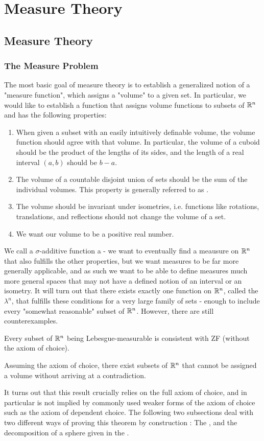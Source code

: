 \part{Measure Theory}
\parttoc
\chapter{Measure Theory}
\section{The Measure Problem}
The most basic goal of measure theory is to establish a generalized notion of a "measure function", which assigns a "volume" to a given set. In particular, we would like to establish a function that assigns volume functions to subsets of $\mathbb{R}^n$ and has the following properties:
\begin{enumerate}
	\item When given a subset with an easily intuitively definable volume, the volume function should agree with that volume. In particular, the volume of a cuboid should be the product of the lengths of its sides, and the length of a real interval $(a,b)$ should be $b-a$.
	\item The volume of a countable disjoint union of sets should be the sum of the individual volumes. This property is generally referred to as .
	\item The volume should be invariant under isometries, i.e. functions like rotations, translations, and reflections should not change the volume of a set.
	\item We want our volume to be a positive real number.
\end{enumerate}
We call a $\sigma$-additive function a  - we want to eventually find a meausure on $\mathbb{R}^n$ that also fulfills the other properties, but we want measures to be far more generally applicable, and as such we want to be able to define measures much more general spaces that may not have a defined notion of an interval or an isometry.
\newpar
It will turn out that there exists exactly one function on $\mathbb{R}^n$, called the  $\lambda^n$, that fulfills these conditions for a very large family of sets - enough to include every "somewhat reasonable" subset of $\mathbb{R}^n$. However, there are still counterexamples.
\begin{proposition}
	Every subset of $\mathbb{R}^n$ being Lebesgue-measurable is consistent with ZF (without the axiom of choice).
\end{proposition}
\begin{theorem}
	Assuming the axiom of choice, there exist subsets of $\mathbb{R}^n$ that cannot be assigned a volume without arriving at a contradiction.
\end{theorem}
It turns out that this result crucially relies on the full axiom of choice, and in particular is not implied by commonly used weaker forms of the axiom of choice such as the axiom of dependent choice.
\newpar
The following two subsections deal with two different ways of proving this theorem by construction : The , and the decomposition of a sphere given in the .
